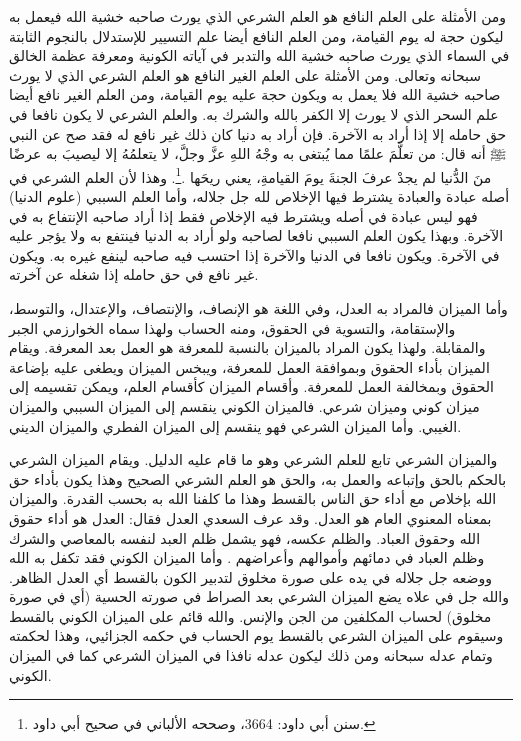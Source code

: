 ومن الأمثلة على العلم النافع هو العلم الشرعي الذي يورث صاحبه خشية الله فيعمل به ليكون حجة له يوم القيامة، ومن العلم النافع أيضا علم التسيير للإستدلال بالنجوم الثابتة في السماء الذي يورث صاحبه خشية الله والتدبر في آياته الكونية ومعرفة عظمة الخالق سبحانه وتعالى. ومن الأمثلة على العلم الغير النافع هو العلم الشرعي الذي لا يورث صاحبه خشية الله فلا يعمل به ويكون حجة عليه يوم القيامة، ومن العلم الغير نافع أيضا علم السحر الذي لا يورث إلا الكفر بالله والشرك به. والعلم الشرعي لا يكون نافعا في حق حامله إلا إذا أراد به الآخرة. فإن أراد به دنيا كان ذلك غير نافع له فقد صح عن النبي ﷺ أنه قال: 
من تعلَّمَ علمًا مما يُبتغى به وجْهُ اللهِ عزَّ وجلَّ، لا يتعلمُهُ إلا ليصيبَ به عرضًا منَ الدُّنيا لم يجدْ عرفَ الجنةَ يومَ القيامةِ، يعني ريحَها \href{https://shamela.ws/book/117359/3086#p1}{\faExternalLink} \cite{SunanAbiDawood}.\footnote{سنن أبي داود: 3664، وصححه الألباني في صحيح أبي داود.}. وهذا لأن العلم الشرعي في أصله عبادة والعبادة يشترط فيها الإخلاص لله جل جلاله، وأما العلم السببي (علوم الدنيا)  فهو ليس عبادة في أصله ويشترط فيه الإخلاص فقط إذا أراد صاحبه الإنتفاع به في الآخرة. وبهذا يكون العلم السببي نافعا لصاحبه ولو أراد به الدنيا فينتفع به ولا يؤجر عليه في الآخرة. ويكون نافعا في الدنيا والآخرة إذا احتسب فيه صاحبه لينفع غيره به. ويكون غير نافع في حق حامله إذا شغله عن آخرته.

وأما الميزان فالمراد به العدل، وفي اللغة هو الإنصاف، والإنتصاف، والإعتدال، والتوسط، والإستقامة، والتسوية في الحقوق، ومنه الحساب ولهذا سماه الخوارزمي الجبر والمقابلة. ولهذا يكون المراد بالميزان بالنسبة للمعرفة هو العمل بعد المعرفة. ويقام الميزان بأداء الحقوق وبموافقة العمل للمعرفة، ويبخس الميزان ويطغى عليه بإضاعة الحقوق وبمخالفة العمل للمعرفة. وأقسام الميزان كأقسام العلم، ويمكن تقسيمه إلى ميزان كوني وميزان شرعي. فالميزان الكوني ينقسم إلى الميزان السببي والميزان الغيبي. وأما الميزان الشرعي فهو ينقسم إلى الميزان الفطري والميزان الديني. 

والميزان الشرعي تابع للعلم الشرعي وهو ما قام عليه الدليل. ويقام الميزان الشرعي بالحكم بالحق وإتباعه والعمل به، والحق هو العلم الشرعي الصحيح وهذا يكون بأداء حق الله بإخلاص مع أداء حق الناس بالقسط وهذا ما كلفنا الله به بحسب القدرة. والميزان بمعناه المعنوي العام هو العدل. وقد عرف السعدي العدل فقال: العدل هو أداء حقوق الله وحقوق العباد. والظلم عكسه، فهو يشمل ظلم العبد لنفسه بالمعاصي والشرك وظلم العباد في دمائهم وأموالهم وأعراضهم \href{https://shamela.ws/book/42/2143#p13}{\faExternalLink} \cite{tafsir_Saadi}. وأما الميزان الكوني فقد تكفل به الله ووضعه جل جلاله في يده على صورة مخلوق لتدبير الكون بالقسط أي العدل الظاهر. والله جل في علاه يضع الميزان الشرعي بعد الصراط في صورته الحسية (أي في صورة مخلوق) لحساب المكلفين من الجن والإنس. والله قائم على الميزان الكوني بالقسط وسيقوم على الميزان الشرعي بالقسط يوم الحساب في حكمه الجزائيي، وهذا لحكمته وتمام عدله سبحانه ومن ذلك ليكون عدله نافذا في الميزان الشرعي كما في الميزان الكوني.

